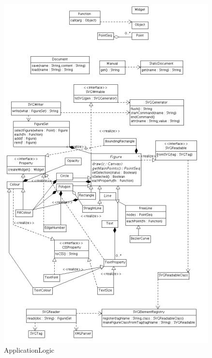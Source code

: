 \begin{figure}[!ht]
\centering
\includegraphics{applogic.jpg}
\caption{ApplicationLogic}
\end{figure}

